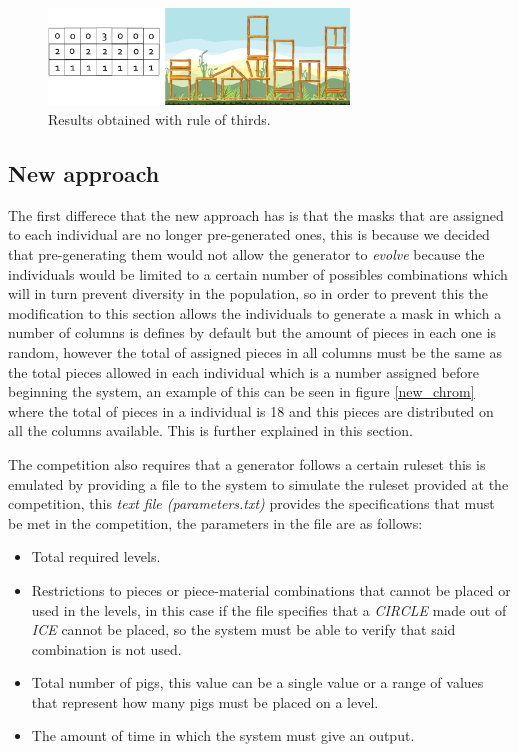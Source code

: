 \documentclass[conference]{IEEEtran}
\begin{document}
    \begin{figure}[htbp]
        \centerline{\includegraphics[width=80mm]{Images/result_example_thirds.png}}
        \caption{Results obtained with rule of thirds.}
        \label{rule_of_thirds_result}
    \end{figure}
    
    \subsection{New approach}
    
    The first differece that the new approach has is that the masks that are assigned
    to each individual are no longer pre-generated ones, this is because we decided
    that pre-generating them would not allow the generator to \textit{evolve}
    because the individuals would be limited to a certain number of possibles
    combinations which will in turn prevent diversity in the population, so in order
    to prevent this the modification to this section allows the individuals to
    generate a mask in which a number of columns is defines by default but the
    amount of pieces in each one is random, however the total of assigned pieces in
    all columns must be the same as the total pieces allowed in each individual
    which is a number assigned before beginning the system, an example of this
    can be seen in figure \ref{new_chrom} where the total of pieces in a individual
    is 18 and this pieces are distributed on all the columns available. This is
    further explained in this section.
    
    The competition also requires that a generator follows a certain ruleset this is 
    emulated by providing a file to the system to simulate the ruleset provided at the 
    competition, this \textit{text file
    (parameters.txt)} provides the specifications that must be met in the
    competition, the parameters in the file are as follows:
    
    \begin{itemize}
        \item Total required levels.
        \item Restrictions to pieces or piece-material combinations that cannot be
        placed or used in the levels, in this case if the file specifies that a
        \textit{CIRCLE} made out of \textit{ICE} cannot be placed, so the system must be
        able to verify that said combination is not used.
        \item Total number of pigs, this value can be a single value or a range of
        values that represent how many pigs must be placed on a level.
        \item The amount of time in which the system must give an output.
    \end{itemize}
    
\end{document}
